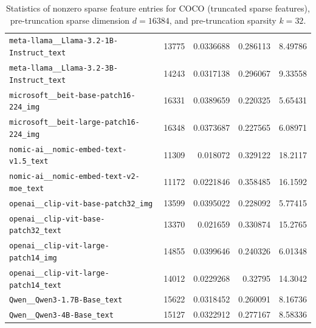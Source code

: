 \begin{table}[htbp]
{\begin{tabular}{lrrrr}
\texttt{meta-llama\_\_Llama-3.2-1B-Instruct\_text} & 13775 & 0.0336688 & 0.286113 & 8.49786 \\
\texttt{meta-llama\_\_Llama-3.2-3B-Instruct\_text} & 14243 & 0.0317138 & 0.296067 & 9.33558 \\
\texttt{microsoft\_\_beit-base-patch16-224\_img} & 16331 & 0.0389659 & 0.220325 & 5.65431 \\
\texttt{microsoft\_\_beit-large-patch16-224\_img} & 16348 & 0.0373687 & 0.227565 & 6.08971 \\
\texttt{nomic-ai\_\_nomic-embed-text-v1.5\_text} & 11309 & 0.018072 & 0.329122 & 18.2117 \\
\texttt{nomic-ai\_\_nomic-embed-text-v2-moe\_text} & 11172 & 0.0221846 & 0.358485 & 16.1592 \\
\texttt{openai\_\_clip-vit-base-patch32\_img} & 13599 & 0.0395022 & 0.228092 & 5.77415 \\
\texttt{openai\_\_clip-vit-base-patch32\_text} & 13370 & 0.021659 & 0.330874 & 15.2765 \\
\texttt{openai\_\_clip-vit-large-patch14\_img} & 14855 & 0.0399646 & 0.240326 & 6.01348 \\
\texttt{openai\_\_clip-vit-large-patch14\_text} & 14012 & 0.0229268 & 0.32795 & 14.3042 \\
\texttt{Qwen\_\_Qwen3-1.7B-Base\_text} & 15622 & 0.0318452 & 0.260091 & 8.16736 \\
\texttt{Qwen\_\_Qwen3-4B-Base\_text} & 15127 & 0.0322912 & 0.277167 & 8.58336 \\
\bottomrule
\end{tabular}
}%
\caption{Statistics of nonzero sparse feature entries for COCO (truncated sparse features), pre-truncation sparse dimension $d=16384$, and pre-truncation sparsity $k=32$.}
\label{tab:sparse-feature-entries-coco-truncated-d16384-k32}
\end{table}
